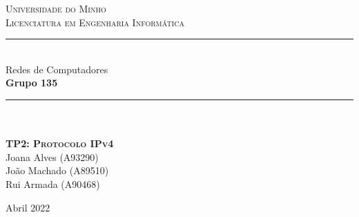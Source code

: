 \documentclass[12pt]{article}
\begin{document}
\begin{titlepage}

\center %

\newcommand{\HRule}{\rule{\linewidth}{0.4mm}} %

\textsc{\LARGE Universidade do Minho}\\[0.5cm]  %

\vspace{1cm}
\textsc{\large Licenciatura em Engenharia Informática}\\[1.5cm] %
\vspace{0.5cm}

\HRule \\[0.5cm]
{ \LARGE \bfseries } Redes de Computadores \\[0.5cm] %
{ \LARGE \bfseries } \textbf{Grupo 135} \\[0.5cm] %
\HRule \\[1cm]
\vspace{0.1cm}
 
\paragraph{}
\paragraph{}
\textsc{\Large \textbf{TP2: Protocolo IPv4 }}\\[0.75cm] %
\vspace{2.5cm} %
Joana Alves (A93290) \\ \vspace{3mm}
João Machado (A89510) \\ \vspace{3mm} 
Rui Armada (A90468) \\ \vspace{3mm}

\vspace{3cm}


\vspace*{\fill}

{\large Abril 2022}\\[2cm] %

\vfill %
\end{titlepage}





\end{document}
